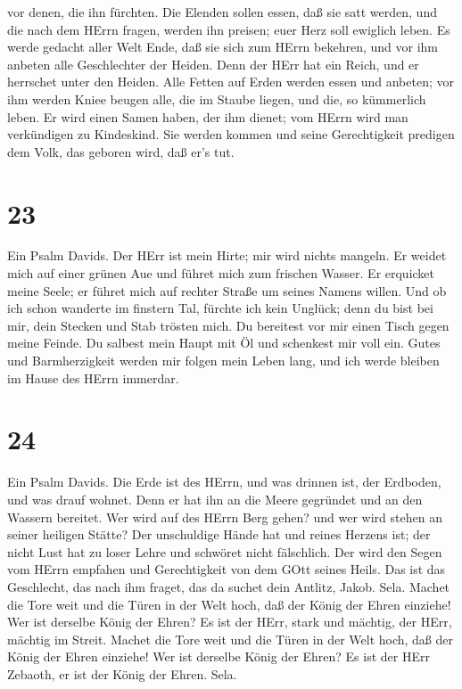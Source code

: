 vor denen, die ihn fürchten.  Die Elenden sollen essen, daß
sie satt werden, und die nach dem HErrn fragen, werden ihn preisen; euer
Herz soll ewiglich leben.  Es werde gedacht aller Welt
Ende, daß sie sich zum HErrn bekehren, und vor ihm anbeten alle
Geschlechter der Heiden.  Denn der HErr hat ein Reich, und
er herrschet unter den Heiden.  Alle Fetten auf Erden
werden essen und anbeten; vor ihm werden Kniee beugen alle, die im
Staube liegen, und die, so kümmerlich leben.  Er wird einen
Samen haben, der ihm dienet; vom HErrn wird man verkündigen zu
Kindeskind.  Sie werden kommen und seine Gerechtigkeit
predigen dem Volk, das geboren wird, daß er's tut.

\hypertarget{section-22}{%
\section{23}\label{section-22}}

 Ein Psalm Davids. Der HErr ist mein Hirte; mir wird nichts
mangeln.  Er weidet mich auf einer grünen Aue und führet
mich zum frischen Wasser.  Er erquicket meine Seele; er
führet mich auf rechter Straße um seines Namens willen.  Und
ob ich schon wanderte im finstern Tal, fürchte ich kein Unglück; denn du
bist bei mir, dein Stecken und Stab trösten mich.  Du
bereitest vor mir einen Tisch gegen meine Feinde. Du salbest mein Haupt
mit Öl und schenkest mir voll ein.  Gutes und Barmherzigkeit
werden mir folgen mein Leben lang, und ich werde bleiben im Hause des
HErrn immerdar.

\hypertarget{section-23}{%
\section{24}\label{section-23}}

 Ein Psalm Davids. Die Erde ist des HErrn, und was drinnen
ist, der Erdboden, und was drauf wohnet.  Denn er hat ihn an
die Meere gegründet und an den Wassern bereitet.  Wer wird
auf des HErrn Berg gehen? und wer wird stehen an seiner heiligen Stätte?
 Der unschuldige Hände hat und reines Herzens ist; der nicht
Lust hat zu loser Lehre und schwöret nicht fälschlich.  Der
wird den Segen vom HErrn empfahen und Gerechtigkeit von dem GOtt seines
Heils.  Das ist das Geschlecht, das nach ihm fraget, das da
suchet dein Antlitz, Jakob. Sela.  Machet die Tore weit und
die Türen in der Welt hoch, daß der König der Ehren einziehe!
 Wer ist derselbe König der Ehren? Es ist der HErr, stark
und mächtig, der HErr, mächtig im Streit.  Machet die Tore
weit und die Türen in der Welt hoch, daß der König der Ehren einziehe!
 Wer ist derselbe König der Ehren? Es ist der HErr Zebaoth,
er ist der König der Ehren. Sela.

